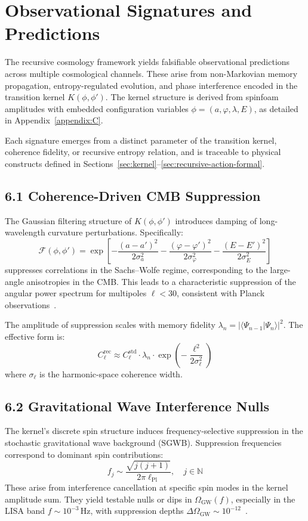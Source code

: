 
\section{Observational Signatures and Predictions}
\label{sec:observables}

The recursive cosmology framework yields falsifiable observational predictions across multiple cosmological channels. These arise from non-Markovian memory propagation, entropy-regulated evolution, and phase interference encoded in the transition kernel \( K(\phi, \phi') \). The kernel structure is derived from spinfoam amplitudes with embedded configuration variables \( \phi = (a, \varphi, \lambda, E) \), as detailed in Appendix~\ref{appendix:C}.

Each signature emerges from a distinct parameter of the transition kernel, coherence fidelity, or recursive entropy relation, and is traceable to physical constructs defined in Sections~\ref{sec:kernel}–\ref{sec:recursive-action-formal}.

\subsection{6.1 Coherence-Driven CMB Suppression}

The Gaussian filtering structure of \( K(\phi, \phi') \) introduces damping of long-wavelength curvature perturbations. Specifically:
\[
\mathcal{F}(\phi, \phi') = \exp\left[-\frac{(a - a')^2}{2\sigma_a^2} - \frac{(\varphi - \varphi')^2}{2\sigma_\varphi^2} - \frac{(E - E')^2}{2\sigma_E^2}\right]
\]
suppresses correlations in the Sachs–Wolfe regime, corresponding to the large-angle anisotropies in the CMB. This leads to a characteristic suppression of the angular power spectrum for multipoles \( \ell < 30 \), consistent with Planck observations~\cite{planck2019inflation}.

The amplitude of suppression scales with memory fidelity \( \lambda_n = |\langle \Psi_{n-1} | \Psi_n \rangle|^2 \). The effective form is:
\[
C_\ell^{\text{rec}} \approx C_\ell^{\text{std}} \cdot \lambda_n \cdot \exp\left(-\frac{\ell^2}{2\sigma_\ell^2}\right)
\]
where \( \sigma_\ell \) is the harmonic-space coherence width.

\subsection{6.2 Gravitational Wave Interference Nulls}

The kernel’s discrete spin structure induces frequency-selective suppression in the stochastic gravitational wave background (SGWB). Suppression frequencies correspond to dominant spin contributions:
\[
f_j \sim \frac{\sqrt{j(j+1)}}{2\pi \ell_{\text{Pl}}}, \quad j \in \mathbb{N}
\]
These arise from interference cancellation at specific spin modes in the kernel amplitude sum. They yield testable nulls or dips in \( \Omega_{\text{GW}}(f) \), especially in the LISA band \( f \sim 10^{-3} \,\text{Hz} \), with suppression depths \( \Delta \Omega_{\text{GW}} \sim 10^{-12} \)~\cite{amaroseoane2017laser}.

